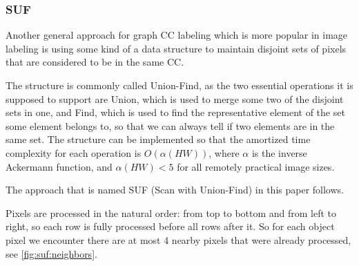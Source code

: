 \documentclass[hidelinks]{llncs}
\newcommand{\texten}[1]{#1}
\newcommand{\textru}[1]{}
\begin{document}
\subsubsection{SUF}

\texten{
Another general approach for graph CC labeling which is more popular in image
labeling is using some kind of a data structure to maintain disjoint sets of
pixels that are considered to be in the same CC.
}\textru{
Другой, более популярный в этом контексте общий подход к подсчёту компонент
связности состоит в том, чтобы использовать структуру данных для поддержания
набора непересекающихся множеств пикселей, чем, по сути, КС и являются.
}

\texten{
The structure is commonly called Union-Find, as the two essential operations it
is supposed to support are Union, which is used to merge some two of the
disjoint sets in one, and Find, which is used to find the representative element
of the set some element belongs to, so that we can always tell if two elements
are in the same set. The structure can be implemented so that the amortized time
complexity for each operation is $O(\alpha(HW))$, where $\alpha$ is the inverse
Ackermann function, and $\alpha(HW) < 5$ for all remotely practical image
sizes\cite{CLRS}. %
}\textru{
Эту структуру принято называть Union-Find, так как две основные операции,
которые она поддерживает, это Union~--- объединение двух множеств в одно, и
Find~--- нахождение характерного представителя для множества, содержащего данный
элемент.
Этот представитель может быть использован для проверки принадлежности двух
элементов одному и тому же множеству.
Эта структура данных хорошо изучена и может быть реализована так, что
амортизированная сложность каждой операции~--- всего $O(\alpha(HW))$, где
$\alpha$~--- обратная функция Аккермана.
Для всех практически возможных размеров изображения эта функция не превосходит
5.
}

\texten{
The approach that is named SUF (Scan with Union-Find) in this paper follows.
}\textru{
Далее следует описание подхода, который мы называем SUF (Scan with Union-Find).
}

\texten{
Pixels are processed in the natural order: from top to bottom and from
left to right, so each row is fully processed before all rows after it.
So for each object pixel we encounter there are at most 4 nearby pixels
that were already processed, see \autoref{fig:suf:neighbors}.
}\textru{
Пиксели обрабатываются в естественном порядке сверху вниз слева направо, так что
каждая строка начинает обрабатываться, когда все предыдущие строки уже
обработаны. Таким образом, у очередного пикселя может быть до четырёх пикселей,
которые находятся рядом и уже были обработаны.
}
\end{document}
